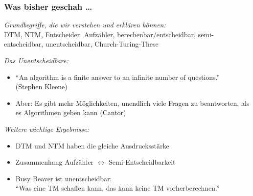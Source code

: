 \documentclass[aspectratio=1610,onlymath]{beamer}
\begin{document}
\maketitle

\begin{frame}\frametitle{Was bisher geschah \ldots}

\emph{Grundbegriffe, die wir verstehen und erklären können:}\\
DTM, NTM, Entscheider, Aufzähler, berechenbar/entscheidbar, semi-entscheidbar, unentscheidbar, Church-Turing-These
\bigskip

\emph{Das Unentscheidbare:}
\begin{itemize}
\item "`An algorithm is a finite answer to an infinite number of questions."'\\ (Stephen Kleene)
\item Aber: Es gibt mehr Möglichkeiten, unendlich viele Fragen zu beantworten, als es Algorithmen geben kann (Cantor)
\end{itemize}

\bigskip
\emph{Weitere wichtige Ergebnisse:}
\begin{itemize}
\item DTM und NTM haben die gleiche Ausdrucksstärke
\item Zusammenhang Aufzähler $\leftrightarrow$ Semi-Entscheidbarkeit
\item Busy Beaver ist unentscheidbar:\\ "`Was eine TM schaffen kann, das kann keine TM vorherberechnen."'
\end{itemize}

\end{frame}


\end{document}
